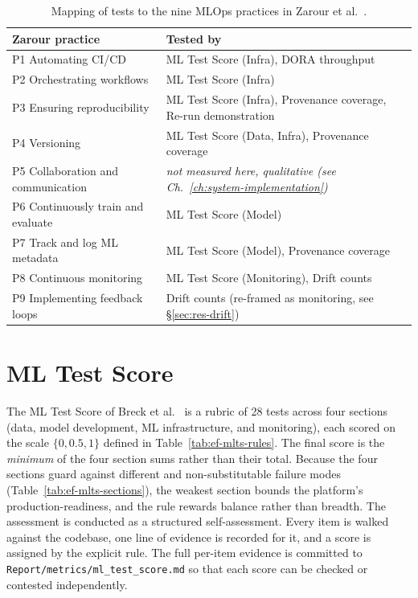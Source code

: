 \begin{table}[h]
  \centering
  \caption{Mapping of tests to the nine MLOps practices in Zarour et al.~\cite{zarour2025}.}
  \label{tab:ef-mapping}
  \begin{tabularx}{\linewidth}{@{}l X@{}}
    \toprule
    \textbf{Zarour practice} & \textbf{Tested by} \\
    \midrule
    P1 Automating CI/CD                  & ML Test Score (Infra), DORA throughput \\
    P2 Orchestrating workflows           & ML Test Score (Infra) \\
    P3 Ensuring reproducibility          & ML Test Score (Infra), Provenance coverage, Re-run demonstration \\
    P4 Versioning                        & ML Test Score (Data, Infra), Provenance coverage \\
    P5 Collaboration and communication   & \emph{not measured here, qualitative (see Ch.~\ref{ch:system-implementation})} \\
    P6 Continuously train and evaluate   & ML Test Score (Model) \\
    P7 Track and log ML metadata         & ML Test Score (Model), Provenance coverage \\
    P8 Continuous monitoring             & ML Test Score (Monitoring), Drift counts \\
    P9 Implementing feedback loops       & Drift counts (re-framed as monitoring, see \S\ref{sec:res-drift}) \\
    \bottomrule
  \end{tabularx}
\end{table}

\section{ML Test Score}
\label{sec:ef-mlts}

The ML Test Score of Breck et al.~\cite{breck2017mltestscore} is a rubric of 28
tests across four sections (data, model development, ML infrastructure, and
monitoring), each scored on the scale $\{0, 0.5, 1\}$ defined in
Table~\ref{tab:ef-mlts-rules}. The final score is the \emph{minimum} of the four
section sums rather than their total. Because the four sections guard against
different and non-substitutable failure modes (Table~\ref{tab:ef-mlts-sections}),
the weakest section bounds the platform's production-readiness, and the rule
rewards balance rather than breadth. The assessment is conducted as a structured
self-assessment. Every item is walked against the codebase, one line of evidence
is recorded for it, and a score is assigned by the explicit rule. The full
per-item evidence is committed to \texttt{Report/metrics/ml\_test\_score.md} so
that each score can be checked or contested independently.


